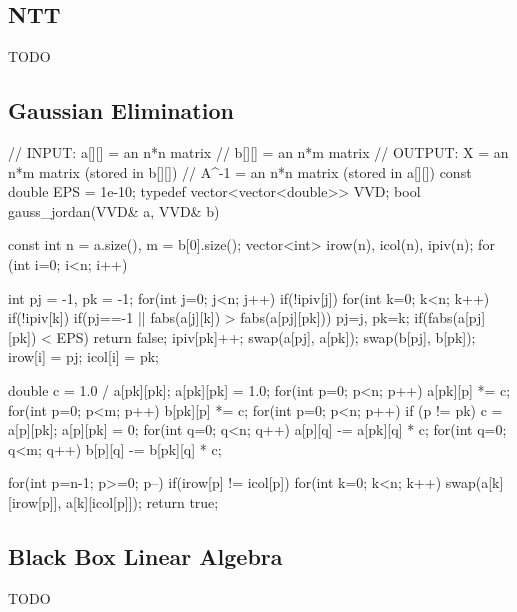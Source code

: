 \subsection{NTT}
TODO

\subsection{Gaussian Elimination}
\begin{cpp}
// INPUT:  a[][] = an n*n matrix
//         b[][] = an n*m matrix
// OUTPUT:   X  = an n*m matrix (stored in b[][])
//       A^{-1} = an n*n matrix (stored in a[][])
const double EPS = 1e-10;
typedef vector<vector<double>> VVD;
bool gauss_jordan(VVD& a, VVD& b) {
  const int n = a.size(), m = b[0].size();
  vector<int> irow(n), icol(n), ipiv(n);
  for (int i=0; i<n; i++){
    int pj = -1, pk = -1;
    for(int j=0; j<n; j++) if(!ipiv[j])
      for(int k=0; k<n; k++) if(!ipiv[k])
        if(pj==-1 || fabs(a[j][k]) > fabs(a[pj][pk]))
          pj=j, pk=k;
    if(fabs(a[pj][pk]) < EPS) return false;
    ipiv[pk]++;
    swap(a[pj], a[pk]); swap(b[pj], b[pk]);
    irow[i] = pj; icol[i] = pk;

    double c = 1.0 / a[pk][pk];
    a[pk][pk] = 1.0;
    for(int p=0; p<n; p++) a[pk][p] *= c;
    for(int p=0; p<m; p++) b[pk][p] *= c;
    for(int p=0; p<n; p++) if (p != pk) {
      c = a[p][pk]; a[p][pk] = 0;
      for(int q=0; q<n; q++) a[p][q] -= a[pk][q] * c;
      for(int q=0; q<m; q++) b[p][q] -= b[pk][q] * c;
    }
  }
  for(int p=n-1; p>=0; p--) if(irow[p] != icol[p]){
    for(int k=0; k<n; k++)
      swap(a[k][irow[p]], a[k][icol[p]]);
  }
  return true;
}
\end{cpp}

\subsection{Black Box Linear Algebra}
TODO